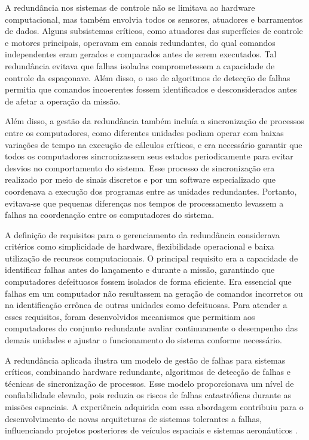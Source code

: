 A redundância nos sistemas de controle não se limitava ao hardware computacional, mas também envolvia todos os sensores, atuadores e barramentos de dados. Alguns subsistemas críticos, como atuadores das superfícies de controle e motores principais, operavam em canais redundantes, do qual comandos independentes eram gerados e comparados antes de serem executados. Tal redundância evitava que falhas isoladas comprometessem a capacidade de controle da espaçonave. Além disso, o uso de algoritmos de detecção de falhas permitia que comandos incoerentes fossem identificados e desconsiderados antes de afetar a operação da missão.

Além disso, a gestão da redundância também incluía a sincronização de processos entre os computadores, como diferentes unidades podiam operar com baixas variações de tempo na execução de cálculos críticos, e era necessário garantir que todos os computadores sincronizassem seus estados periodicamente para evitar desvios no comportamento do sistema. Esse processo de sincronização era realizado por meio de sinais discretos e por um software especializado que coordenava a execução dos programas entre as unidades redundantes. Portanto, evitava-se que pequenas diferenças nos tempos de processamento levassem a falhas na coordenação entre os computadores do sistema.

A definição de requisitos para o gerenciamento da redundância considerava critérios como simplicidade de hardware, flexibilidade operacional e baixa utilização de recursos computacionais. O principal requisito era a capacidade de identificar falhas antes do lançamento e durante a missão, garantindo que computadores defeituosos fossem isolados de forma eficiente. Era essencial que falhas em um computador não resultassem na geração de comandos incorretos ou na identificação errônea de outras unidades como defeituosas. Para atender a esses requisitos, foram desenvolvidos mecanismos que permitiam aos computadores do conjunto redundante avaliar continuamente o desempenho das demais unidades e ajustar o funcionamento do sistema conforme necessário.

A redundância aplicada ilustra um modelo de gestão de falhas para sistemas críticos, combinando hardware redundante, algoritmos de detecção de falhas e técnicas de sincronização de processos. Esse modelo proporcionava um nível de confiabilidade elevado, pois reduzia os riscos de falhas catastróficas durante as missões espaciais. A experiência adquirida com essa abordagem contribuiu para o desenvolvimento de novas arquiteturas de sistemas tolerantes a falhas, influenciando projetos posteriores de veículos espaciais e sistemas aeronáuticos \citep{sklaroff1976}.
